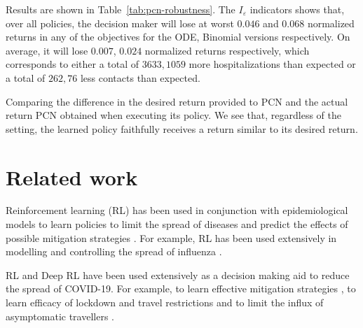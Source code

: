 \documentclass{article}
\renewcommand{\cite}[1]{\citep{#1}}
\begin{document}
Results are shown in Table~\ref{tab:pcn-robustness}. The $I_\varepsilon$ indicators shows that, over all policies, the decision maker will lose at worst $0.046$ and $0.068$ normalized returns in any of the objectives for the ODE, Binomial versions respectively. On average, it will lose $0.007$, $0.024$ normalized returns respectively, which corresponds to either a total of $3633, 1059$ more hospitalizations than expected or a total of $262, 76$ less contacts than expected.

\begin{table}[t]
    \centering
    \setlength{\tabcolsep}{0.5em} %
    {\renewcommand{\arraystretch}{1.2}%
    
    }
    \caption{Comparing the difference in the desired return provided to PCN and the actual return PCN obtained when executing its policy. We see that, regardless of the setting, the learned policy faithfully receives a return similar to its desired return.}
    \label{tab:pcn-robustness}
\end{table}

\section{Related work}
Reinforcement learning (RL) has been used in conjunction with epidemiological models to learn policies to limit the spread of diseases and predict the effects of possible mitigation strategies \cite{probert2019context,ernst2006clinical}. For example, RL has been used extensively in modelling and controlling the spread of influenza \cite{das2008large,libin2020,libin2018bayesian}.
 
RL and Deep RL have been used extensively as a decision making aid to reduce the spread of COVID-19. For example, to learn effective mitigation strategies \cite{ohi2020exploring}, to learn efficacy of lockdown and travel restrictions \cite{kwak2021covid} and to limit the influx of asymptomatic travellers \cite{bastani2021efficient}.
\end{document}

